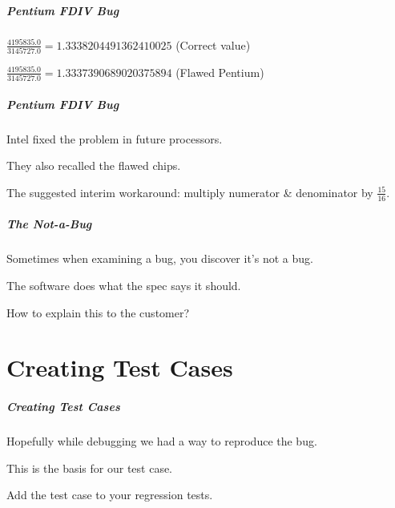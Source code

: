 \begin{frame}
\frametitle{Pentium FDIV Bug}
\begin{changemargin}{1cm}

$\frac{4195835.0}{3145727.0} = 1.333 820 449 136 241 002 5$  (Correct value)


$\frac{4195835.0}{3145727.0} = 1.333 739 068 902 037 589 4$  (Flawed Pentium)

\end{changemargin}
\end{frame}

\begin{frame}
\frametitle{Pentium FDIV Bug}
\begin{changemargin}{1cm}

Intel fixed the problem in future processors.

They also recalled the flawed chips.

The suggested interim workaround: multiply numerator \& denominator by $\frac{15}{16}$. 

\end{changemargin}
\end{frame}

\begin{frame}
\frametitle{The Not-a-Bug}
\begin{changemargin}{1cm}

Sometimes when examining a bug, you discover it's not a bug.

The software does what the spec says it should.

How to explain this to the customer?

\end{changemargin}
\end{frame}

\part{Creating Test Cases}
\frame{\partpage}

\begin{frame}
\frametitle{Creating Test Cases}
\begin{changemargin}{1cm}

Hopefully while debugging we had a way to reproduce the bug.

This is the basis for our test case.

Add the test case to your regression tests.

\end{changemargin}
\end{frame}

